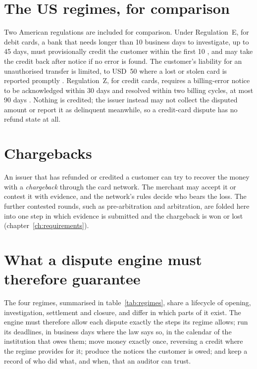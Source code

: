 \section{The US regimes, for comparison}
\label{sec:bg-us}

Two American regulations are included for comparison. Under Regulation~E, for debit cards, a bank that needs longer than 10 business days to
investigate, up to 45 days, must provisionally credit the customer within the first 10
\cite[\S~1005.11(c)]{rege}, and may take the credit back after notice if no error is found. The
customer's liability for an unauthorised transfer is limited, to USD~50 where a lost or
stolen card is reported promptly \cite[\S~1005.6]{rege}. Regulation~Z, for credit cards, requires
a billing-error notice to be acknowledged within 30 days and resolved within two billing
cycles, at most 90 days \cite[\S~1026.13(c)]{regz}. Nothing is credited; the issuer instead may
not collect the disputed amount or report it as delinquent meanwhile, so a credit-card dispute has
no refund state at all.

\section{Chargebacks}
\label{sec:bg-chargebacks}

An issuer that has refunded or credited a customer can try to recover the money with a
\emph{chargeback} through the card network. The merchant may accept it or contest it with
evidence, and the network's rules decide who bears the loss. The further contested rounds, such as
pre-arbitration and arbitration, are folded here into one step in which evidence is submitted and
the chargeback is won or lost (chapter~\ref{ch:requirements}).

\section{What a dispute engine must therefore guarantee}
\label{sec:bg-guarantees}

The four regimes, summarised in table~\ref{tab:regimes}, share a lifecycle of opening,
investigation, settlement and closure, and differ in which parts of it exist. The engine must
therefore allow each dispute exactly the steps its regime allows; run its deadlines, in business
days where the law says so, in the calendar of the institution that owes them; move money exactly
once, reversing a credit where the regime provides for it; produce the notices the customer is
owed; and keep a record of who did what, and when, that an auditor can trust.

